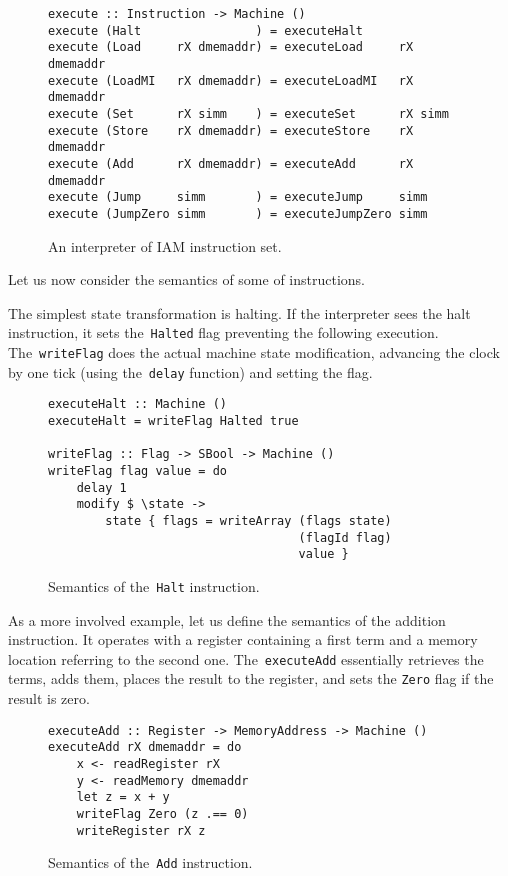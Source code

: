 \begin{figure}[H]
\begin{verbatim}
execute :: Instruction -> Machine ()
execute (Halt                ) = executeHalt
execute (Load     rX dmemaddr) = executeLoad     rX dmemaddr
execute (LoadMI   rX dmemaddr) = executeLoadMI   rX dmemaddr
execute (Set      rX simm    ) = executeSet      rX simm
execute (Store    rX dmemaddr) = executeStore    rX dmemaddr
execute (Add      rX dmemaddr) = executeAdd      rX dmemaddr
execute (Jump     simm       ) = executeJump     simm
execute (JumpZero simm       ) = executeJumpZero simm
\end{verbatim}
\caption{An interpreter of IAM instruction set.}
\label{execute}
\end{figure}

Let us now consider the semantics of some of instructions.

The simplest state transformation is halting. If the interpreter sees the halt instruction, it
sets the~\texttt{Halted} flag preventing the following execution.
The~\texttt{writeFlag} does the actual machine state modification,
advancing the clock by one tick (using the~\texttt{delay} function)
and setting the flag.

\begin{figure}[H]
\begin{verbatim}
executeHalt :: Machine ()
executeHalt = writeFlag Halted true

writeFlag :: Flag -> SBool -> Machine ()
writeFlag flag value = do
    delay 1
    modify $ \state ->
        state { flags = writeArray (flags state)
                                   (flagId flag)
                                   value }
\end{verbatim}
\caption{Semantics of the~\texttt{Halt} instruction.}
\label{haltSemantics}
\end{figure}

As a more involved example, let us define the semantics of the addition instruction.
It operates with a register containing a first term and a memory location referring
to the second one. The~\texttt{executeAdd} essentially retrieves the terms,
adds them, places the result to the register, and sets the \texttt{Zero}
flag if the result is zero.

\begin{figure}[H]
\begin{verbatim}
executeAdd :: Register -> MemoryAddress -> Machine ()
executeAdd rX dmemaddr = do
    x <- readRegister rX
    y <- readMemory dmemaddr
    let z = x + y
    writeFlag Zero (z .== 0)
    writeRegister rX z
\end{verbatim}
\caption{Semantics of the~\texttt{Add} instruction.}
\label{addSemantics}
\end{figure}

